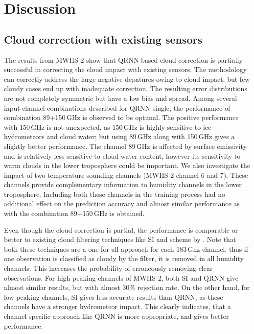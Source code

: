 \documentclass[amt, manuscript]{copernicus}
\begin{document}
\section{Discussion}
\label{discussions}

\subsection{Cloud correction with existing sensors}
%
The results from MWHS-2 show that QRNN based cloud correction is partially successful in correcting the cloud impact with existing sensors. The methodology can correctly address the large negative depatures owing to cloud impact, but few cloudy cases end up with inadequate correction. The resulting error distributions are not completely symmetric but have a low bias and spread. Among several input channel combinations described for QRNN-single, the performance of combination 89+150\,GHz is observed to be optimal. The positive performance with 150\,GHz is not unexpected, as 150\,GHz is highly sensitive to ice hydrometeors and cloud water; but using 89\,GHz along with 150\,GHz gives a slightly better performance. The channel 89\,GHz is affected by surface emissivity and is relatively less sensitive to cloud water content, however its sensitivity to warm clouds in the lower troposphere could be important. We also investigate the impact of two temperature sounding channels (MWHS-2 channel 6 and 7). These channels provide complementary information to humidity channels in the lower troposphere. Including both these channels in the training process had no additional effect on the prediction accuracy and almost similar performance as with the combination 89+150\,GHz is obtained. 

Even though the cloud correction is partial, the performance is comparable or better to existing cloud filtering techniques like SI and scheme by \cite{buehler:aclou:07}. Note that both these techniques are a one for all approach for each 183\,Ghz channel; thus if one observation is classified as cloudy by the filter, it is removed in all humidity channels. This increases the probability of erroneously removing clear observations. For high peaking channels of MWHS-2, both SI and QRNN give almost similar results, but with almost 30\% rejection rate. On the other hand, for low peaking channels, SI gives less accurate results than QRNN, as these channels have a stronger hydrometeor impact. This clearly indicates, that a channel specific approach like QRNN is more appropriate, and gives better performance. 
\end{document}
